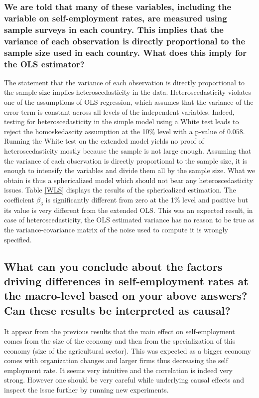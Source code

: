 \subsubsection{We are told that many of these variables, including the variable on self-employment rates, are measured using sample surveys in each country. This implies that the variance of each observation is directly proportional to the sample size used in each country. What does this imply for the OLS estimator?}
The statement that the variance of each observation is directly proportional to the sample size implies heteroscedasticity in the data. Heteroscedasticity violates one of the assumptions of OLS regression, which assumes that the variance of the error term is constant across all levels of the independent variables.
Indeed, testing for heteroscedasticity in the simple model using a White test leads to reject the homoskedascity assumption at the  10\% level with a p-value of $0.058$. Running the White test on the extended
model yields no proof of heteroscedasticity mostly because the sample is not large enough.
Assuming that the variance of each observation is directly proportional to the sample size,
it is enough to intensify the variables and divide them all by the sample size. What we obtain is thus
a sphericalized model which should not bear any heteroscedasticity issues. Table \ref{WLS} displays the results
of the sphericalized estimation.
The coefficient $\beta_3$ is significantly different from zero at the 1\% level and positive but its value is very different from the extended OLS. This was an expected result, in case of heteroscedasticity, the OLS estimated variance has no reason to be true as the variance-covariance matrix of the noise used to compute it is wrongly specified.

\subsection{What can you conclude about the factors driving differences in self-employment rates at the
macro-level based on your above answers? Can these results be interpreted as causal?}
It appear from the previous results that the main effect on self-employment comes from the size of the economy and then from the specialization of this economy (size of the agricultural sector).
This was expected as a bigger economy comes with organization changes and larger firms thus decreasing the self employment rate.
It seems very intuitive and the correlation is indeed very strong. However one should be very careful while underlying causal effects and inspect the issue further by running new experiments.